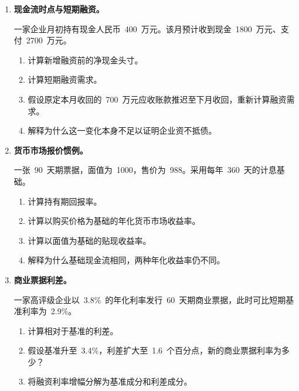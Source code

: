 \begin{enumerate}

\item \textbf{现金流时点与短期融资。}

一家企业月初持有现金人民币~400~万元。该月预计收到现金~1800~万元、支付~2700~万元。

\begin{enumerate}

\item 计算新增融资前的净现金头寸。

\item 计算短期融资需求。

\item 假设原定本月收回的~700~万元应收账款推迟至下月收回，重新计算融资需求。

\item 解释为什么这一变化本身不足以证明企业资不抵债。

\end{enumerate}

\item \textbf{货币市场报价惯例。}

一张~90~天期票据，面值为~1000，售价为~988。采用每年~360~天的计息基础。

\begin{enumerate}

\item 计算持有期回报率。

\item 计算以购买价格为基础的年化货币市场收益率。

\item 计算以面值为基础的贴现收益率。

\item 解释为什么基础现金流相同，两种年化收益率仍不同。

\end{enumerate}

\item \textbf{商业票据利差。}

一家高评级企业以~3.8\%~的年化利率发行~60~天期商业票据，此时可比短期基准利率为~2.9\%。

\begin{enumerate}

\item 计算相对于基准的利差。

\item 假设基准升至~3.4\%，利差扩大至~1.6~个百分点，新的商业票据利率为多少？

\item 将融资利率增幅分解为基准成分和利差成分。


\end{enumerate}
\end{enumerate}
